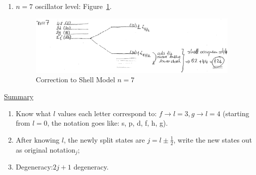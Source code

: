 \documentclass{school-22.101-notes}
\begin{document}
\begin{enumerate}
\item $n=7$ oscillator level: Figure~\ref{shell-126}.
\begin{figure}
    \centering
    \includegraphics[width=4in]{images/shell/magic-number-126.png}
    \caption{Correction to Shell Model $n=7$\label{shell-126}}
\end{figure}
\end{enumerate}

\uline{Summary}
\begin{enumerate}
\item Know what $l$ values each letter correspond to: $ f \to l=3, g \to l=4$ (starting from $l=0$, the notation goes like: s, p, d, f, h, g). 
\item After knowing $l$, the newly split states are $j= l \pm \frac{1}{2}$, write the new states out as original notation$_{j}$;
\item Degeneracy:$2 j+1$ degeneracy.  
\end{enumerate}
\end{document}
